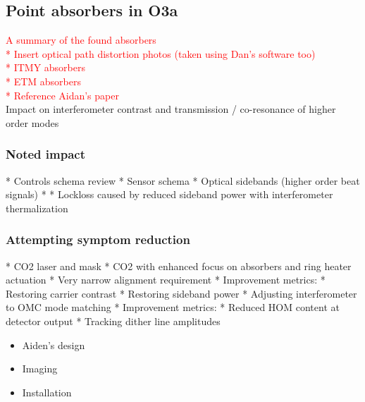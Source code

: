 
\subsection{Point absorbers in O3a}
\textcolor{red}{A summary of the found absorbers \\
	* Insert optical path distortion photos (taken using Dan's software too) \\
		* ITMY absorbers \\
		* ETM absorbers \\
	* Reference Aidan's paper} \\

Impact on interferometer contrast and transmission / co-resonance of higher order modes

\subsubsection{Noted impact}
	* Controls schema review
		* Sensor schema
		* Optical sidebands (higher order beat signals)
		* 
	* Lockloss caused by reduced sideband power with interferometer thermalization

\subsubsection{Attempting symptom reduction}
	* CO2 laser and mask
		* CO2 with enhanced focus on absorbers and ring heater actuation
		* Very narrow alignment requirement
		* Improvement metrics:
			* Restoring carrier contrast
			* Restoring sideband power	
	* Adjusting interferometer to OMC mode matching
		* Improvement metrics:
			* Reduced HOM content at detector output
			* Tracking dither line amplitudes

\begin{itemize}
\item Aiden's design
\item Imaging
\item Installation

\end{itemize}

